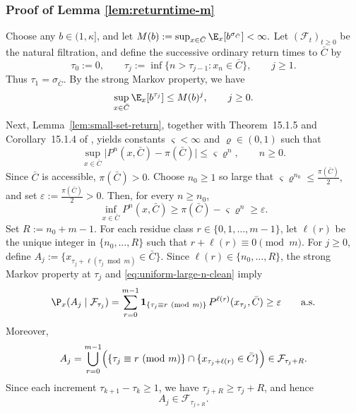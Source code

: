 \documentclass[mnsc,nonblindrev]{informs3}
\begin{document}
\subsubsection{Proof of Lemma \ref{lem:returntime-m}}\label{sec:returntime-m}
Choose any \(b\in(1,\kappa]\), and let $M(b):=\sup_{x\in\bar C}\E_x\!\left[b^{\sigma_{\bar C}}\right]<\infty.$ Let \((\mathcal F_t)_{t\ge0}\) be the natural filtration, and define the successive
ordinary return times to \(\bar C\) by
\[
\tau_0:=0,
\qquad
\tau_j:=\inf\{n>\tau_{j-1}:x_n\in\bar C\},
\qquad j\ge1.
\]
Thus \(\tau_1=\sigma_{\bar C}\). By the strong
Markov property, we have
\begin{equation}\label{eq:tauj-moment-clean}
\sup_{x\in\bar C}\E_x\!\left[b^{\tau_j}\right]\le M(b)^j,
\qquad j\ge0.
\end{equation}
Next, Lemma~\ref{lem:small-set-return}, together with Theorem~15.1.5 and Corollary~15.1.4 of \cite{douc2018markov}, yields constants \(\varsigma<\infty\) and \(\varrho\in(0,1)\) such that
\[
\sup_{x\in\bar C}\bigl|P^n(x,\bar C)-\pi(\bar C)\bigr|
\le \varsigma \varrho^n,
\qquad n\ge0.
\]
Since \(\bar C\) is accessible, \(\pi(\bar C)>0\). Choose \(n_0\ge1\) so large that $\varsigma \varrho^{n_0}\le \frac{\pi(\bar C)}{2},$ and set $\varepsilon:=\frac{\pi(\bar C)}{2}>0.$ Then, for every \(n\ge n_0\),
\begin{equation}\label{eq:uniform-large-n-clean}
\inf_{x\in\bar C}P^n(x,\bar C)
\ge \pi(\bar C)-\varsigma\varrho^n
\ge \varepsilon.
\end{equation}
Set $R:=n_0+m-1.$ For each residue class \(r\in\{0,1,\dots,m-1\}\), let \(\ell(r)\) be the unique
integer in \(\{n_0,\dots,R\}\) such that $r+\ell(r)\equiv 0\pmod m.$ For \(j\ge0\), define $A_j:=\{x_{\tau_j+\ell(\tau_j\bmod m)}\in\bar C\}.$
Since \(\ell(r)\in\{n_0,\dots,R\}\), the strong Markov property at \(\tau_j\) and
\eqref{eq:uniform-large-n-clean} imply
\begin{align}
\P_x(A_j\mid\mathcal F_{\tau_j})
=
\sum_{r=0}^{m-1}\mathbf 1_{\{\tau_j\equiv r\ (\mathrm{mod}\ m)\}}
\,P^{\ell(r)}(x_{\tau_j},\bar C) \ge \varepsilon
\qquad\text{a.s.} \label{eq:Aj-prob-clean}
\end{align}
Moreover,
\[
A_j
=
\bigcup_{r=0}^{m-1}
\Bigl(\{\tau_j\equiv r\ (\mathrm{mod}\ m)\}\cap
\{x_{\tau_j+\ell(r)}\in\bar C\}\Bigr)
\in \mathcal F_{\tau_j+R}.
\]
Since each increment \(\tau_{k+1}-\tau_k\ge1\), we have \(\tau_{j+R}\ge \tau_j+R\),
and hence
\begin{equation}\label{eq:Aj-measurable-clean}
A_j\in \mathcal F_{\tau_{j+R}}.
\end{equation}
\end{document}
